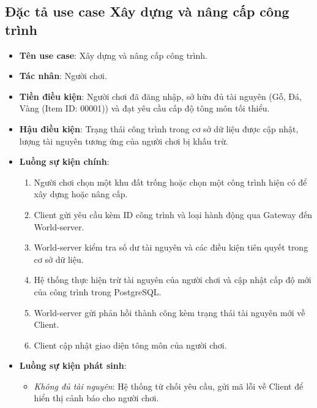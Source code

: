 \documentclass[../Project.tex]{subfiles}
\begin{document}
\subsection{Đặc tả use case Xây dựng và nâng cấp công trình}
\begin{itemize}
    \item \textbf{Tên use case}: Xây dựng và nâng cấp công trình.
    \item \textbf{Tác nhân}: Người chơi.
    \item \textbf{Tiền điều kiện}: Người chơi đã đăng nhập, sở hữu đủ tài nguyên (Gỗ, Đá, Vàng (Item ID: 00001)) và đạt yêu cầu cấp độ tông môn tối thiểu.
    \item \textbf{Hậu điều kiện}: Trạng thái công trình trong cơ sở dữ liệu được cập nhật, lượng tài nguyên tương ứng của người chơi bị khấu trừ.
    \item \textbf{Luồng sự kiện chính}:
    \begin{enumerate}
        \item Người chơi chọn một khu đất trống hoặc chọn một công trình hiện có để xây dựng hoặc nâng cấp.
        \item Client gửi yêu cầu kèm ID công trình và loại hành động qua Gateway đến World-server.
        \item World-server kiểm tra số dư tài nguyên và các điều kiện tiên quyết trong cơ sở dữ liệu.
        \item Hệ thống thực hiện trừ tài nguyên của người chơi và cập nhật cấp độ mới của công trình trong PostgreSQL.
        \item World-server gửi phản hồi thành công kèm trạng thái tài nguyên mới về Client.
        \item Client cập nhật giao diện tông môn của người chơi.
    \end{enumerate}
    \item \textbf{Luồng sự kiện phát sinh}:
    \begin{itemize}
        \item \textit{Không đủ tài nguyên}: Hệ thống từ chối yêu cầu, gửi mã lỗi về Client để hiển thị cảnh báo cho người chơi.
    \end{itemize}
\end{itemize}
\end{document}
